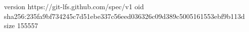 version https://git-lfs.github.com/spec/v1
oid sha256:235fa9bf734245c7d51ebe337c56eed036326c09d389c5005161553ebf9b113d
size 155557
